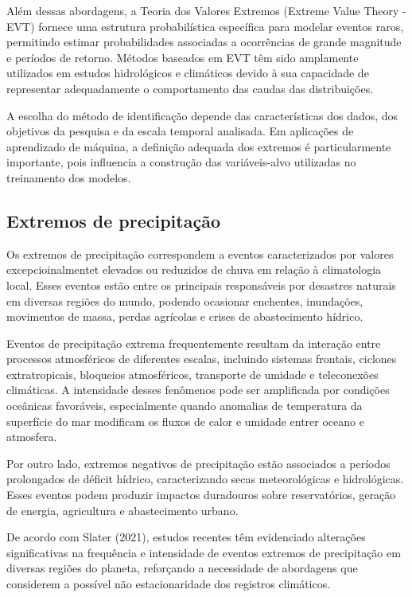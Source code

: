 	Além dessas abordagens, a Teoria dos Valores Extremos (Extreme Value Theory - EVT) fornece uma estrutura probabilística específica para modelar eventos raros, permitindo estimar probabilidades associadas a ocorrências de grande magnitude e períodos de retorno.
	Métodos baseados em EVT têm sido amplamente utilizados em estudos hidrológicos e climáticos devido à sua capacidade de representar adequadamente o comportamento das caudas das distribuições.

	A escolha do método de identificação depende das características dos dados, dos objetivos da pesquisa e da escala temporal analisada.
	Em aplicações de aprendizado de máquina, a definição adequada dos extremos é particularmente importante, pois influencia a construção das variáveis-alvo utilizadas no treinamento dos modelos.

\subsection{Extremos de precipitação}\label{sec:extremos-precipitacao}

	Os extremos de precipitação correspondem a eventos caracterizados por valores excepcioinalmentet elevados ou reduzidos de chuva em relação à climatologia local.
	Esses eventos estão entre os principais responsáveis por desastres naturais em diversas regiões do mundo, podendo ocasionar enchentes, inundações, movimentos de massa, perdas agrícolas e crises de abastecimento hídrico.

	Eventos de precipitação extrema frequentemente resultam da interação entre processos atmosféricos de diferentes escalas, incluindo sistemas frontais, ciclones extratropicais, bloqueios atmosféricos, transporte de umidade e teleconexões climáticas.
	A intensidade desses fenômenos pode ser amplificada por condições oceânicas favoráveis, especialmente quando anomalias de temperatura da superfície do mar modificam os fluxos de calor e umidade entrer oceano e atmosfera.

	Por outro lado, extremos negativos de precipitação estão associados a períodos prolongados de déficit hídrico, caracterizando secas meteorológicas e hidrológicas.
	Esses eventos podem produzir impactos duradouros sobre reservatórios, geração de energia, agricultura e abastecimento urbano.

	De acordo com Slater (2021), estudos recentes têm evidenciado alterações significativas na frequência e intensidade de eventos extremos de precipitação em diversas regiões do planeta, reforçando a necessidade de abordagens que considerem a possível não estacionaridade dos registros climáticos.

